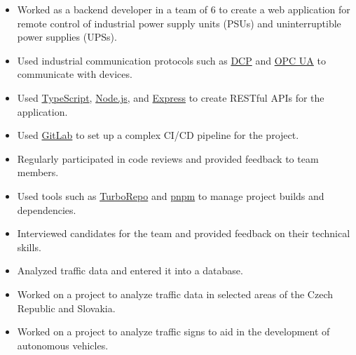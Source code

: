 \documentclass[10pt,a4paper,ragged2e,withhyper]{altacv}
\begin{document}


\makecvheader
\bigskip
{}

\begin{paracol}{2}

	\begin{itemize}
		\item Worked as a backend developer in a team of 6 to create a web application for remote control of industrial power supply units (PSUs) and uninterruptible power supplies (UPSs).
		\item Used industrial communication protocols such as \href{https://profinetuniversity.com/naming-addressing/profinet-dcp/}{DCP} and \href{https://opcfoundation.org/about/opc-technologies/opc-ua/}{OPC UA} to communicate with devices.
		\item Used \href{https://www.typescriptlang.org/}{TypeScript}, \href{https://nodejs.org/}{Node.js}, and \href{https://expressjs.com/}{Express} to create RESTful APIs for the application.
		\item Used \href{https://gitlab.com/}{GitLab} to set up a complex CI/CD pipeline for the project.
		\item Regularly participated in code reviews and provided feedback to team members.
		\item Used tools such as \href{https://turborepo.com/}{TurboRepo} and \href{https://pnpm.io/}{pnpm} to manage project builds and dependencies.
		\item Interviewed candidates for the team and provided feedback on their technical skills.
	\end{itemize}

	\divider

	\begin{itemize}
		\item Analyzed traffic data and entered it into a database.
		\item Worked on a project to analyze traffic data in selected areas of the Czech Republic and Slovakia.
		\item Worked on a project to analyze traffic signs to aid in the development of autonomous vehicles.
	\end{itemize}


\end{paracol}
\end{document}
